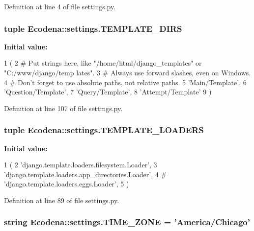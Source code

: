 Definition at line 4 of file settings.py.

\hypertarget{namespace_ecodena_1_1settings_a4dabd274b6d22e33a380f7a03e124b9f}{
\subsubsection[{TEMPLATE\_\-DIRS}]{\setlength{\rightskip}{0pt plus 5cm}tuple {\bf Ecodena::settings.TEMPLATE\_\-DIRS}}}
\label{d1/d62/namespace_ecodena_1_1settings_a4dabd274b6d22e33a380f7a03e124b9f}
{\bfseries Initial value:}
\begin{DoxyCode}
1 (
2     # Put strings here, like "/home/html/django_templates" or "C:/www/django/temp
      lates".
3     # Always use forward slashes, even on Windows.
4     # Don't forget to use absolute paths, not relative paths.
5         'Main/Template',
6         'Question/Template',
7         'Query/Template',
8         'Attempt/Template'
9 )
\end{DoxyCode}


Definition at line 107 of file settings.py.

\hypertarget{namespace_ecodena_1_1settings_ac0ae09ebc4a08171087c635ef78bf07b}{
\subsubsection[{TEMPLATE\_\-LOADERS}]{\setlength{\rightskip}{0pt plus 5cm}tuple {\bf Ecodena::settings.TEMPLATE\_\-LOADERS}}}
\label{d1/d62/namespace_ecodena_1_1settings_ac0ae09ebc4a08171087c635ef78bf07b}
{\bfseries Initial value:}
\begin{DoxyCode}
1 (
2     'django.template.loaders.filesystem.Loader',
3     'django.template.loaders.app_directories.Loader',
4 #     'django.template.loaders.eggs.Loader',
5 )
\end{DoxyCode}


Definition at line 89 of file settings.py.

\hypertarget{namespace_ecodena_1_1settings_ae020435689531ba9e6e4b27436829bb6}{
\subsubsection[{TIME\_\-ZONE}]{\setlength{\rightskip}{0pt plus 5cm}string {\bf Ecodena::settings.TIME\_\-ZONE} = 'America/Chicago'}}
\label{d1/d62/namespace_ecodena_1_1settings_ae020435689531ba9e6e4b27436829bb6}


